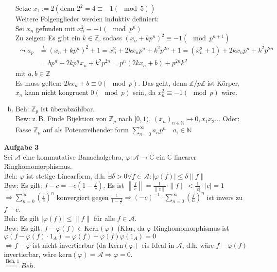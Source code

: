 \documentclass{article}
\begin{document}
\begin{enumerate}[(a)]
Setze $x_1:=2 \left(\text{denn } 2^2=4\equiv-1(\mod 5)\right)$\\
Weitere Folgenglieder werden induktiv definiert:\\
Sei $x_n$ gefunden mit $x_n^2\equiv-1(\mod p^n)$\\
Zu zeigen: Es gibt ein $k\in\mathbb{Z}$, sodass $(x_n+kp^n)^2\equiv-1(\mod p^{n+1})$\\
\begin{align*}\leadsto a_p &\stackrel{!}{=}(x_n+kp^n)^2+1=x_n^2+2kx_np^n+k^2p^{2n}+1=(x_n^2+1)+2kx_np^n+k^2p^{2n}\\
&=bp^n+2kp^nx_n+k^2p^{2n}=p^n(2kx_n+b)+p^{2n}k^2\end{align*}
mit $a,b\in\mathbb{Z}$\\
Es muss gelten: $2kx_n+b\equiv0(\mod p)$.
Das geht, denn $\mathbb{Z}/p\mathbb{Z}$ ist Körper, $x_n$ kann nicht kongruent $0(\mod p)$ sein, da $x_n^2\equiv -1(\mod p)$ wäre.
\item Beh: $\mathbb{Z}_p$ ist überabzählbar.\\
Bew: z.\,B. Finde Bijektion von $\mathbb{Z}_p$ nach $[0,1)$, $(x_n)_{n\in\mathbb{N}}\mapsto 0,x_1x_2\ldots$
Oder: Fasse $\mathbb{Z}_p$ auf als \glqq Potenzreihen\grqq der form $\sum\limits_{n=0}^\infty a_np^n\quad a_i\in\mathbb{N}$
\end{enumerate}

\textbf{Aufgabe 3}\\
Sei $\mathcal{A}$ eine kommutative Banachalgebra, $\varphi: \mathcal{A}\rightarrow\mathbb{C}$ ein $\mathbb{C}$ linearer Ringhomomorphismus.\\
Beh: $\varphi$ ist stetige Linearform, d.h. $\exists\delta>0\forall f\in\mathcal{A}: |\varphi(f)|\leq\delta\|f\|$\\
Bew: Es gilt: $f-c=-c\left(1-\frac{f}{c}\right)$. Es ist $\left\|\frac{f}{c}\right\|=\frac{1}{\|c\|}\cdot\|f\|<\frac{1}{|c|}\cdot|c|=1$\\
$\Rightarrow\sum\limits_{n=0}^\infty\left(\frac{f}{c}\right)^n$ konvergiert gegen $\frac{1}{1-\frac{f}{c}}\Rightarrow(-c)^{-1}\cdot\sum\limits_{n=0}^\infty\left(\frac{f}{n}\right)^n$ ist invers zu $f-c$.\\
Beh: Es gilt $|\varphi(f)|\leq\|f\|$ für alle $f\in\mathcal{A}$.\\
Bew: Es gilt: $f-\varphi(f)\in\text{Kern}(\varphi)$ (Klar, da $\varphi$ Ringhomomorphismus ist $\varphi\left(f-\varphi(f)\cdot1_A\right)=\varphi(f)-\varphi(f)\varphi(1_A)=0$\\
$\Rightarrow f-\varphi$ ist nicht invertierbar (da $\text{Kern}(\varphi)$ eis Ideal in $\mathcal{A}$, d.h. wäre $f-\varphi(f)$ invertierbar, wäre $\text{kern}(\varphi)=\mathcal{A}\Rightarrow\varphi=0$.\\
$\stackrel{\text{Beh. 1}}{\Longrightarrow} Beh.$\\
\end{document}

